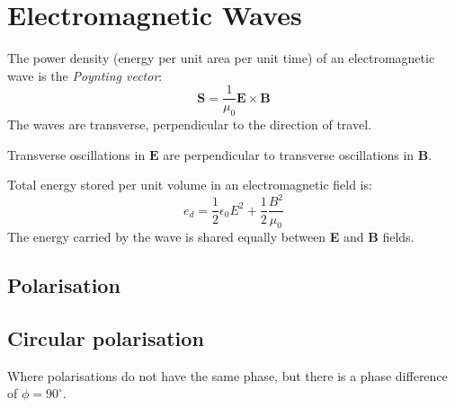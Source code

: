 \section{Electromagnetic Waves}
The power density (energy per unit area per unit time) of an electromagnetic wave is the \textit{Poynting vector}:
\begin{equation*}
    \mathbf{S} = \frac{1}{\mu_0}\mathbf{E} \times \mathbf{B}
\end{equation*}
The waves are transverse, perpendicular to the direction of travel.

Transverse oscillations in $\mathbf{E}$ are perpendicular to transverse oscillations in $\mathbf{B}$.

Total energy stored per unit volume in an electromagnetic field is:
\begin{equation*}
    e_{d} = \frac{1}{2}\epsilon_0 E^2 + \frac{1}{2}\frac{B^2}{\mu_0}
\end{equation*}
The energy carried by the wave is shared equally between \textbf{E} and \textbf{B} fields.

\subsection*{Polarisation}

\subsection*{Circular polarisation}
Where polarisations do not have the same phase, but there is a phase difference of $\phi = 90^{\circ}$.